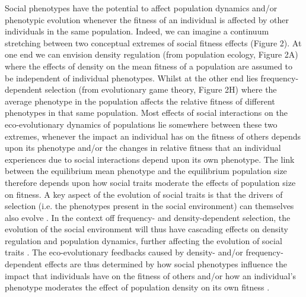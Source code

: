 \documentclass{article}
\begin{document}
Social phenotypes have the potential to affect population dynamics and/or phenotypic evolution whenever the fitness of an individual is affected by other individuals in the same population. Indeed, we can imagine a continuum stretching between two conceptual extremes of social fitness effects (Figure 2). At one end we can envision density regulation (from population ecology, Figure 2A) where the effects of density on the mean fitness of a population are assumed to be independent of individual phenotypes. Whilst at the other end lies frequency-dependent selection (from evolutionary game theory, Figure 2H) where the average phenotype in the population affects the relative fitness of different phenotypes in that same population. Most effects of social interactions on the eco-evolutionary dynamics of populations lie somewhere between these two extremes, whenever the impact an individual has on the fitness of others depends upon its phenotype and/or the changes in relative fitness that an individual experiences due to social interactions depend upon its own phenotype. The link between the equilibrium mean phenotype and the equilibrium population size therefore depends upon how social traits moderate the effects of population size on fitness. A key aspect of the evolution of social traits is that the drivers of selection (i.e. the phenotypes present in the social environment) can themselves also evolve \citep{West-Eberhard1979, Moore1997}. In the context off frequency- and density-dependent selection, the evolution of the social environment will thus have cascading effects on density regulation and population dynamics, further affecting the evolution of social traits \citep{Heino1998}. The eco-evolutionary feedbacks caused by density- and/or frequency-dependent effects are thus determined by how social phenotypes influence the impact that individuals have on the fitness of others and/or how an individual's phenotype moderates the effect of population density on its own fitness \citep{Engen2020}. 
\end{document}

